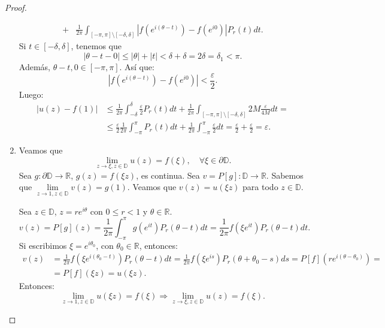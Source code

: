 \begin{proof}
\begin{enumerate}
\begin{align*}
                  +                & \frac{1}{2\pi} \int_{[-\pi, \pi] \setminus [-\delta, \delta]} \left|f\left(e^{i(\theta-t)}\right) - f\left(e^{i0}\right)\right|P_r(t)dt.
              \end{align*}
              Si $t \in [-\delta, \delta]$, tenemos que
              $$|\theta-t-0| \leq |\theta| + |t| < \delta + \delta = 2\delta = \delta_1 < \pi.$$
              Además, $\theta-t, 0 \in [-\pi, \pi]$.
              Así que:
              $$\left|f\left(e^{i(\theta-t)}\right) - f\left(e^{i0}\right)\right| < \frac{\varepsilon}{2}.$$
              Luego:
              \begin{align*}
                  |u(z)-f(1)| & \leq \frac{1}{2\pi} \int_{-\delta}^\delta \frac{\varepsilon}{2}P_r(t)dt + \frac{1}{2\pi} \int_{[-\pi, \pi] \setminus [-\delta, \delta]} 2M\frac{\varepsilon}{4M}dt =                      \\
                              & \leq \frac{\varepsilon}{2}\frac{1}{2\pi} \int_{-\pi}^\pi P_r(t)dt + \frac{1}{2\pi} \int_{-\pi}^\pi \frac{\varepsilon}{2}dt = \frac{\varepsilon}{2} + \frac{\varepsilon}{2} = \varepsilon.
              \end{align*}

        \item Veamos que
              $$\lim_{z \to \xi, z \in \mathbb{D}} u(z) = f(\xi), \quad \forall \xi \in \partial\mathbb{D}.$$
              Sea $g: \partial\mathbb{D} \to \mathbb{R}$, $g(z) = f(\xi z)$, es continua.
              Sea $v = P[g]: \mathbb{D} \to \mathbb{R}$.
              Sabemos que $\lim\limits_{z \to 1, z \in \mathbb{D}} v(z) = g(1)$.
              Veamos que $v(z) = u(\xi z)$ para todo $z \in \mathbb{D}$.

              Sea $z \in \mathbb{D}$, $z = re^{i\theta}$ con $0 \leq r < 1$ y $\theta \in \mathbb{R}$.
              $$v(z) = P[g](z) = \frac{1}{2\pi} \int_{-\pi}^\pi g(e^{it})P_r(\theta-t)dt = \frac{1}{2\pi} f(\xi e^{it})P_r(\theta-t)dt.$$
              Si escribimos $\xi = e^{i\theta_0}$, con $\theta_0 \in \mathbb{R}$, entonces:
              \begin{align*}
                  v(z) & = \frac{1}{2\pi} f(\xi e^{i(\theta_0-t)})P_r(\theta-t)dt = \frac{1}{2\pi} f(\xi e^{is})P_r(\theta+\theta_0-s)ds = P[f](re^{i(\theta-\theta_0)}) = \\
                       & = P[f](\xi z) = u(\xi z).
              \end{align*}
              Entonces:
              $$\lim_{z \to 1, z \in \mathbb{D}} u(\xi z) = f(\xi) \Rightarrow \lim_{z \to \xi, z \in \mathbb{D}} u(z) = f(\xi).$$


\end{enumerate}
\end{proof}
